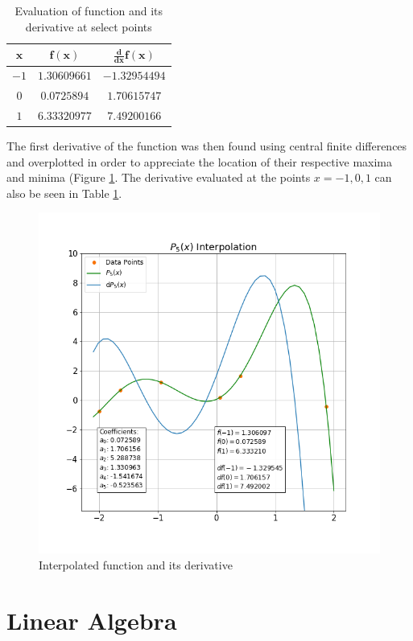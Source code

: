\documentclass[twocolumn]{article}
\begin{document}
\begin{table}[h!]
 \centering
 \begin{tabular}{|c|c|c|}
 \hline
 $\boldsymbol{x}$ & $\boldsymbol{f(x)}$ & $\boldsymbol{\frac{d}{dx}f(x)}$ \\
 \hline
 $-1$ & $1.30609661$ & $-1.32954494$\\
 $0$ & $0.0725894$ & $1.70615747$\\
 $1$ & $6.33320977$ & $7.49200166$\\
 \hline
 \end{tabular}
 \caption{Evaluation of function and its derivative at select points}
 \label{tab:interp_x}
\end{table}
\vfill\eject
The first derivative of the function was then found using central finite differences and overplotted in order to
appreciate the location of their respective maxima and minima (Figure \ref{fig:interp}. The derivative evaluated at the points
$x=-1,0,1$ can also be seen in Table \ref{tab:interp_x}.
\begin{figure}[h!]
 \centering
 \includegraphics[scale = 0.4]{interp}
 \caption{Interpolated function and its derivative}
 \label{fig:interp}
\end{figure}

\section{Linear Algebra}
\end{document}
